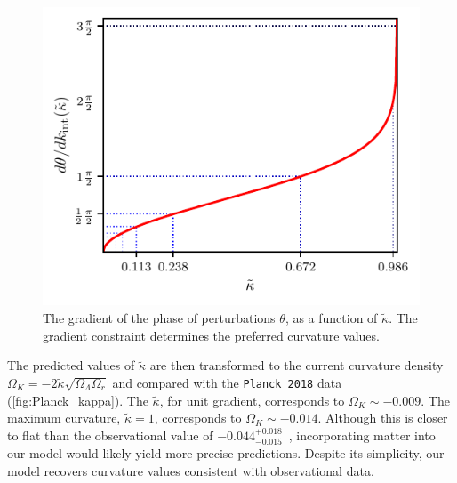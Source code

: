 \documentclass[%
 reprint,
 amsmath,amssymb,
 prl,
]{revtex4-2}
\begin{document}
\begin{figure}
     \includegraphics{slope_kappa.pdf}
     \caption{The gradient of the phase of perturbations \(\theta\), as a function of \(\tilde\kappa\). The gradient constraint determines the preferred curvature values.}
     \label{fig:Slope_kc}
\end{figure} 

The predicted values of \(\tilde{\kappa}\) are then transformed to the current curvature density \(\Omega_K=-2\tilde{\kappa}\sqrt{\Omega_\Lambda\Omega_r}\) and compared with the \texttt{Planck 2018} data (\cref{fig:Planck_kappa}). The \(\tilde{\kappa}\), for unit gradient, corresponds to \(\Omega_K\sim -0.009\). The maximum curvature, \(\tilde{\kappa}=1\), corresponds to \(\Omega_K\sim -0.014\). Although this is closer to flat than the observational value of \(-0.044^{+0.018}_{-0.015}\)~\cite{2021PhRvD.103d1301H,2020NatAs...4..196D,2020A&A...641A...6P}, incorporating matter into our model would likely yield more precise predictions. Despite its simplicity, our model recovers curvature values consistent with observational data. 
\end{document}
